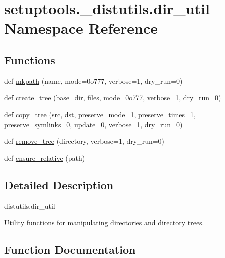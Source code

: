 \hypertarget{namespacesetuptools_1_1__distutils_1_1dir__util}{}\section{setuptools.\+\_\+distutils.\+dir\+\_\+util Namespace Reference}
\label{namespacesetuptools_1_1__distutils_1_1dir__util}
\subsection*{Functions}
\begin{DoxyCompactItemize}
\item 
def \hyperlink{namespacesetuptools_1_1__distutils_1_1dir__util_a82c544d263b30ce37020640fa26c5ecf}{mkpath} (name, mode=0o777, verbose=1, dry\+\_\+run=0)
\item 
def \hyperlink{namespacesetuptools_1_1__distutils_1_1dir__util_a80933b11d97a9c38807cc92de3fe923e}{create\+\_\+tree} (base\+\_\+dir, files, mode=0o777, verbose=1, dry\+\_\+run=0)
\item 
def \hyperlink{namespacesetuptools_1_1__distutils_1_1dir__util_aaccf8f899743a8eb443c6389502f88bc}{copy\+\_\+tree} (src, dst, preserve\+\_\+mode=1, preserve\+\_\+times=1, preserve\+\_\+symlinks=0, update=0, verbose=1, dry\+\_\+run=0)
\item 
def \hyperlink{namespacesetuptools_1_1__distutils_1_1dir__util_a7e2284b026c6cb8672e5e07174bbd5fe}{remove\+\_\+tree} (directory, verbose=1, dry\+\_\+run=0)
\item 
def \hyperlink{namespacesetuptools_1_1__distutils_1_1dir__util_a551dd5039a40f062536669d5045f691a}{ensure\+\_\+relative} (path)
\end{DoxyCompactItemize}


\subsection{Detailed Description}
\begin{DoxyVerb}distutils.dir_util

Utility functions for manipulating directories and directory trees.\end{DoxyVerb}
 

\subsection{Function Documentation}
\mbox{\label{namespacesetuptools_1_1__distutils_1_1dir__util_aaccf8f899743a8eb443c6389502f88bc}} 
